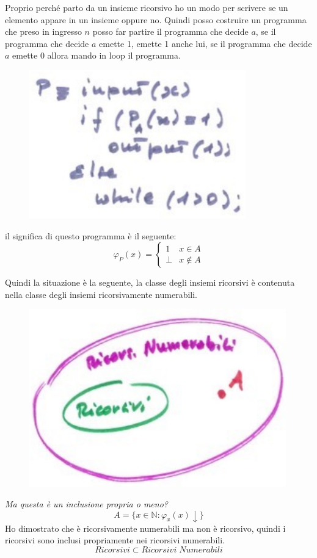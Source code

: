 \documentclass{article}
\begin{document}
Proprio perché parto da un insieme ricorsivo ho un modo per scrivere se un elemento
appare in un insieme oppure no. Quindi posso costruire un programma che preso
in ingresso $n$ posso far partire il programma che decide $a$, se il programma che decide
$a$ emette 1, emette 1 anche lui, se il programma che decide $a$ emette 0 allora mando in loop
il programma.
\begin{figure}[H]
    \centering
    \includegraphics[scale=0.6]{images/pdia.png}
\end{figure}
il significa di questo programma è il seguente:
\[
    \varphi_P(x)=
    \begin{cases}
        1    & x\in A    \\
        \bot & x\notin A
    \end{cases}
\]

Quindi la situazione è la seguente, la classe degli insiemi ricorsivi è contenuta nella
classe degli insiemi ricorsivamente numerabili.
\begin{figure}[H]
    \centering
    \includegraphics[scale=0.6]{images/ric_ricenum.png}
\end{figure}
\textit{Ma questa è un inclusione
    propria o meno?}
$$A=\{x\in\mathbb{N}:\varphi_x(x)\downarrow\}$$
Ho dimostrato che è ricorsivamente numerabili ma non è ricorsivo, quindi i ricorsivi
sono inclusi propriamente nei ricorsivi numerabili.
$$Ricorsivi \subset Ricorsivi\;Numerabili$$
\end{document}
